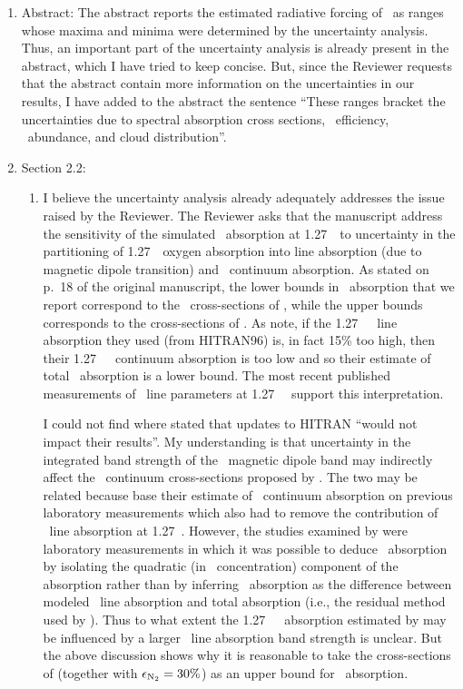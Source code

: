 \documentclass[12pt,twoside]{article}
\begin{document}
\begin{enumerate}
\item Abstract: The abstract reports the estimated radiative forcing
of \OdX\ as ranges whose maxima and minima were determined by the
uncertainty analysis. 
Thus, an important part of the uncertainty analysis is already present
in the abstract, which I have tried to keep concise.
But, since the Reviewer requests that the abstract contain more
information on the uncertainties in our results, I have added to the
abstract the sentence ``These ranges bracket the uncertainties due to
spectral absorption cross sections, \OdNd\ efficiency, \OdX\
abundance, and cloud distribution''.

\item Section 2.2: 
\begin{enumerate}
\item I believe the uncertainty analysis already adequately addresses
the issue raised by the Reviewer.
The Reviewer asks that the manuscript address the sensitivity of the
simulated \OdX\ absorption at 1.27~\um\ to uncertainty in the
partitioning of 1.27~\um\ oxygen absorption into line absorption
(due to magnetic dipole transition) and \OdX\ continuum absorption.  
As stated on p.~18 of the original manuscript, the lower bounds in
\OdX\ absorption that we report correspond to the \OdX\ cross-sections
of \cite{MCB98}, while the upper bounds corresponds to the
cross-sections of \cite{SPS98}.
As \cite{MCB98} note, if the 1.27~\um\ \Od\ line absorption they used
(from HITRAN96) is, in fact 15\% too high, then their 1.27~\um\ \OdX\
continuum absorption is too low and so their estimate of total \OdX\
absorption is a lower bound.
The most recent published measurements of \Od\ line parameters at
1.27~\um\ \cite[]{LSL98} support this interpretation. 

I could not find where \cite{SPS98} stated that updates to HITRAN
``would not impact their results''.
My understanding is that uncertainty in the integrated band strength
of the \Od\ magnetic dipole band may indirectly affect the \OdX\
continuum cross-sections proposed by \cite{SPS98}.
The two may be related because \cite{SPS98} base their estimate of
\OdX\ continuum absorption on previous laboratory measurements which
also had to remove the contribution of \Od\ line absorption at
1.27~\um. 
However, the studies examined by \cite{SPS98} were laboratory
measurements in which it was possible to deduce \OdX\ absorption by
isolating the quadratic (in \Od\ concentration) component of the
absorption \cite[e.g.,][]{GOB90} rather than by inferring \OdX\
absorption as the difference between modeled \Od\ line absorption and
total absorption (i.e., the residual method used by \cite{MCB98}).   
Thus to what extent the 1.27~\um\ \OdOd\ absorption estimated by
\cite{SPS98} may be influenced by a larger \Od\ line absorption band
strength is unclear.
But the above discussion shows why it is reasonable to take the 
cross-sections of \cite{SPS98} (together with $\epsilon_{\mathrm{N}_{2}} = 30\%$)
as an upper bound for \OdX\ absorption.


\end{enumerate}
\end{enumerate}
\end{document}

